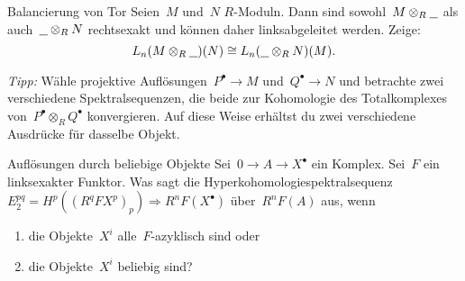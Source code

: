 \documentclass{uebblatt}
\begin{document}
\begin{aufgabe}{Balancierung von Tor}
Seien~$M$ und~$N$ $R$-Moduln. Dann sind sowohl~$M \otimes_R \underline{\ \ }$
als auch~$\underline{\ \ } \otimes_R N$ rechtsexakt und können daher
linksabgeleitet werden. Zeige:
\[ L_n(M \otimes_R \underline{\ \ })(N) \cong L_n(\underline{\ \ } \otimes_R
N)(M). \]
{\tiny\emph{Tipp:} Wähle projektive Auflösungen~$P^\bullet \to M$
und~$Q^\bullet \to N$ und betrachte zwei verschiedene Spektralsequenzen, die
beide zur Kohomologie des Totalkomplexes von~$P^\bullet \otimes_R Q^\bullet$
konvergieren. Auf diese Weise erhältst du zwei verschiedene Ausdrücke für
dasselbe Objekt.\par}
\end{aufgabe}

\begin{aufgabe}{Auflösungen durch beliebige Objekte}
Sei~$0 \to A \to X^\bullet$ ein Komplex. Sei~$F$ ein linksexakter Funktor. Was
sagt die Hyperkohomologiespektralsequenz
$E^{pq}_2 = H^p((R^q F X^p)_p) \Rightarrow R^nF(X^\bullet)$ über~$R^nF(A)$ aus,
wenn
\begin{enumerate}
\item die Objekte~$X^i$ alle~$F$-azyklisch sind oder
\item die Objekte~$X^i$ beliebig sind?
\end{enumerate}
\end{aufgabe}
\end{document}
